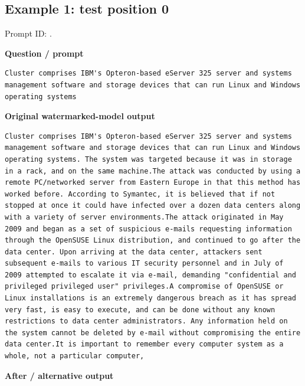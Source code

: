 \subsection{Example 1: test position
0}\label{record-docs-watermarking-qualitative-paper-kgw-vanilla-md-example-1-test-position-0}

Prompt ID:
\texttt{}.

\textbf{Question / prompt}

\begin{Verbatim}
Cluster comprises IBM's Opteron-based eServer 325 server and systems management software and storage devices that can run Linux and Windows operating systems
\end{Verbatim}

\textbf{Original watermarked-model output}

\begin{Verbatim}
Cluster comprises IBM's Opteron-based eServer 325 server and systems management software and storage devices that can run Linux and Windows operating systems. The system was targeted because it was in storage in a rack, and on the same machine.The attack was conducted by using a remote PC/networked server from Eastern Europe in that this method has worked before. According to Symantec, it is believed that if not stopped at once it could have infected over a dozen data centers along with a variety of server environments.The attack originated in May 2009 and began as a set of suspicious e-mails requesting information through the OpenSUSE Linux distribution, and continued to go after the data center. Upon arriving at the data center, attackers sent subsequent e-mails to various IT security personnel and in July of 2009 attempted to escalate it via e-mail, demanding "confidential and privileged privileged user" privileges.A compromise of OpenSUSE or Linux installations is an extremely dangerous breach as it has spread very fast, is easy to execute, and can be done without any known restrictions to data center administrators. Any information held on the system cannot be deleted by e-mail without compromising the entire data center.It is important to remember every computer system as a whole, not a particular computer,
\end{Verbatim}

\textbf{After / alternative output}

